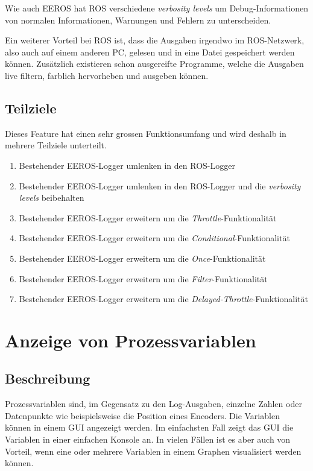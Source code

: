 Wie auch EEROS hat ROS verschiedene \textit{verbosity levels} um Debug-Informationen von normalen Informationen, Warnungen und Fehlern zu unterscheiden.

Ein weiterer Vorteil bei ROS ist, dass die Ausgaben irgendwo im ROS-Netzwerk, also auch auf einem anderen PC, gelesen und in eine Datei gespeichert werden können.
Zusätzlich existieren schon ausgereifte Programme, welche die Ausgaben live filtern, farblich hervorheben und ausgeben können. 

\subsection{Teilziele}
Dieses Feature hat einen sehr grossen Funktionsumfang und wird deshalb in mehrere Teilziele unterteilt.
\begin{enumerate}
\item Bestehender EEROS-Logger umlenken in den ROS-Logger
\item Bestehender EEROS-Logger umlenken in den ROS-Logger und die \textit{verbosity levels} beibehalten
\item Bestehender EEROS-Logger erweitern um die \textit{Throttle}-Funktionalität
\item Bestehender EEROS-Logger erweitern um die \textit{Conditional}-Funktionalität
\item Bestehender EEROS-Logger erweitern um die \textit{Once}-Funktionalität
\item Bestehender EEROS-Logger erweitern um die \textit{Filter}-Funktionalität
\item Bestehender EEROS-Logger erweitern um die \textit{Delayed-Throttle}-Funktionalität
\end{enumerate}


\section{Anzeige von Prozessvariablen}
\subsection{Beschreibung}
Prozessvariablen sind, im Gegensatz zu den Log-Ausgaben, einzelne Zahlen oder Datenpunkte wie beispielsweise die Position eines Encoders.
Die Variablen können in einem GUI angezeigt werden.
Im einfachsten Fall zeigt das GUI die Variablen in einer einfachen Konsole an.
In vielen Fällen ist es aber auch von Vorteil, wenn eine oder mehrere Variablen in einem Graphen visualisiert werden können.

